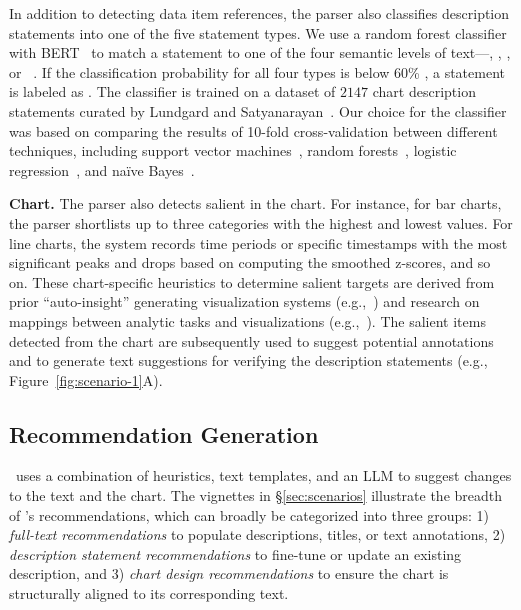 In addition to detecting data item references, the parser also classifies description statements into one of the five statement types.
We use a random forest classifier with BERT~\cite{sanh2019distilbert} to match a statement to one of the four semantic levels of text---, , , or ~\cite{lundgard2021accessible}.
If the classification probability for all four types is below 60\% , a statement is labeled as .
The classifier is trained on a dataset of $2147$ chart description statements curated by Lundgard and Satyanarayan~\cite{lundgard2021accessible}.
Our choice for the classifier was based on comparing the results of 10-fold cross-validation between different techniques, including support vector machines~\cite{Cortes1995SupportVectorN}, random forests~\cite{breiman2001}, logistic regression~\cite{strother1967}, and na\"{i}ve Bayes~\cite{Duda1974PatternCA}.

\textbf{Chart.}
The parser also detects salient  in the chart.
For instance, for bar charts, the parser shortlists up to three categories with the highest and lowest values.
For line charts, the system records time periods or specific timestamps with the most significant peaks and drops based on computing the smoothed z-scores, and so on.
These chart-specific heuristics to determine salient targets are derived from prior ``auto-insight'' generating visualization systems (e.g.,~\cite{cui2019datasite,wang2019datashot,srinivasan2018augmenting,demiralp2017foresight}) and research on mappings between analytic tasks and visualizations (e.g.,~\cite{amar2005low,schulz2013design,saket2018task}).
The salient items detected from the chart are subsequently used to suggest potential annotations and to generate text suggestions for verifying the description statements (e.g., Figure~\ref{fig:scenario-1}A).

\subsection{Recommendation Generation}
\label{sec:reco-generation}
\pluto~uses a combination of heuristics, text templates, and an LLM to suggest changes to the text and the chart.
The vignettes in \S\ref{sec:scenarios} illustrate the breadth of \pluto's recommendations, which can broadly be categorized into three groups: 1) \textit{full-text recommendations} to populate descriptions, titles, or text annotations, 2) \textit{description statement recommendations} to fine-tune or update an existing description, and 3) \textit{chart design recommendations} to ensure the chart is structurally aligned to its corresponding text.

